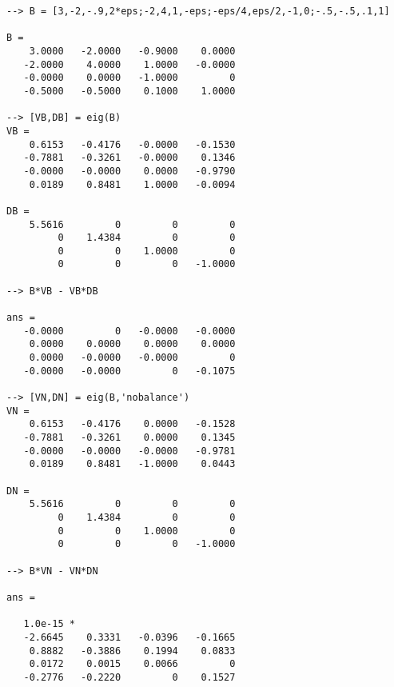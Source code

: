 \begin{verbatim}
--> B = [3,-2,-.9,2*eps;-2,4,1,-eps;-eps/4,eps/2,-1,0;-.5,-.5,.1,1]

B = 
    3.0000   -2.0000   -0.9000    0.0000 
   -2.0000    4.0000    1.0000   -0.0000 
   -0.0000    0.0000   -1.0000         0 
   -0.5000   -0.5000    0.1000    1.0000 

--> [VB,DB] = eig(B)
VB = 
    0.6153   -0.4176   -0.0000   -0.1530 
   -0.7881   -0.3261   -0.0000    0.1346 
   -0.0000   -0.0000    0.0000   -0.9790 
    0.0189    0.8481    1.0000   -0.0094 

DB = 
    5.5616         0         0         0 
         0    1.4384         0         0 
         0         0    1.0000         0 
         0         0         0   -1.0000 

--> B*VB - VB*DB

ans = 
   -0.0000         0   -0.0000   -0.0000 
    0.0000    0.0000    0.0000    0.0000 
    0.0000   -0.0000   -0.0000         0 
   -0.0000   -0.0000         0   -0.1075 

--> [VN,DN] = eig(B,'nobalance')
VN = 
    0.6153   -0.4176    0.0000   -0.1528 
   -0.7881   -0.3261    0.0000    0.1345 
   -0.0000   -0.0000   -0.0000   -0.9781 
    0.0189    0.8481   -1.0000    0.0443 

DN = 
    5.5616         0         0         0 
         0    1.4384         0         0 
         0         0    1.0000         0 
         0         0         0   -1.0000 

--> B*VN - VN*DN

ans = 

   1.0e-15 * 
   -2.6645    0.3331   -0.0396   -0.1665 
    0.8882   -0.3886    0.1994    0.0833 
    0.0172    0.0015    0.0066         0 
   -0.2776   -0.2220         0    0.1527 
\end{verbatim}
